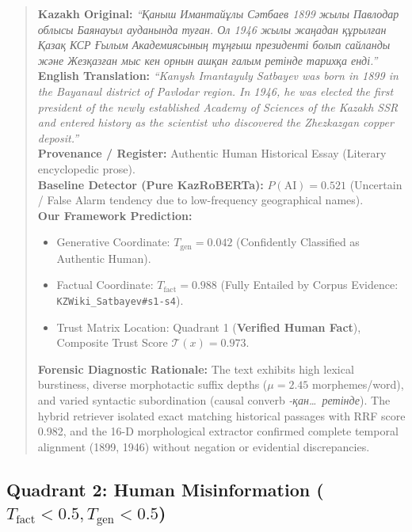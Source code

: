 \begin{quote}
\textbf{Kazakh Original:} \textit{``Қаныш Имантайұлы Сәтбаев 1899 жылы Павлодар облысы Баянауыл ауданында туған. Ол 1946 жылы жаңадан құрылған Қазақ КСР Ғылым Академиясының тұңғыш президенті болып сайланды және Жезқазған мыс кен орнын ашқан ғалым ретінде тарихқа енді.''} \\
\textbf{English Translation:} \textit{``Kanysh Imantayuly Satbayev was born in 1899 in the Bayanaul district of Pavlodar region. In 1946, he was elected the first president of the newly established Academy of Sciences of the Kazakh SSR and entered history as the scientist who discovered the Zhezkazgan copper deposit.''} \\
\textbf{Provenance / Register:} Authentic Human Historical Essay (Literary encyclopedic prose). \\
\textbf{Baseline Detector (Pure KazRoBERTa):} $P(\text{AI}) = 0.521$ (Uncertain / False Alarm tendency due to low-frequency geographical names). \\
\textbf{Our Framework Prediction:}
\begin{itemize}
    \item Generative Coordinate: $T_{\text{gen}} = 0.042$ (Confidently Classified as Authentic Human).
    \item Factual Coordinate: $T_{\text{fact}} = 0.988$ (Fully Entailed by Corpus Evidence: \newline \texttt{KZWiki\_Satbayev\#s1-s4}).
    \item Trust Matrix Location: Quadrant 1 (\textbf{Verified Human Fact}), Composite Trust Score $\mathcal{T}(x) = 0.973$.
\end{itemize}
\textbf{Forensic Diagnostic Rationale:} The text exhibits high lexical burstiness, diverse morphotactic suffix depths ($\mu = 2.45$ morphemes/word), and varied syntactic subordination (causal converb \textit{-қан\dots\ ретінде}). The hybrid retriever isolated exact matching historical passages with RRF score 0.982, and the 16-D morphological extractor confirmed complete temporal alignment (1899, 1946) without negation or evidential discrepancies.
\end{quote}

\subsection{Quadrant 2: Human Misinformation \texorpdfstring{($T_{\text{fact}} < 0.5, T_{\text{gen}} < 0.5$)}{(T-fact < 0.5, T-gen < 0.5)}}
\label{sec:app_case_q2}


